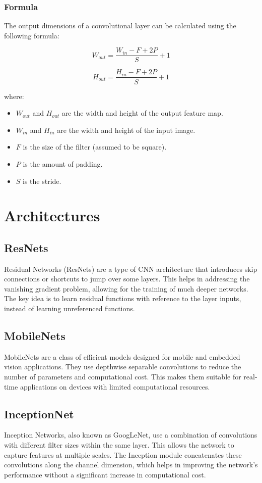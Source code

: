 \documentclass[12pt]{article}
\begin{document}
\subsubsection{Formula}
The output dimensions of a convolutional layer can be calculated using the following formula:

\[
W_{out} = \frac{W_{in} - F + 2P}{S} + 1
\]

\[
H_{out} = \frac{H_{in} - F + 2P}{S} + 1
\]

where:
\begin{itemize}
    \item \( W_{out} \) and \( H_{out} \) are the width and height of the output feature map.
    \item \( W_{in} \) and \( H_{in} \) are the width and height of the input image.
    \item \( F \) is the size of the filter (assumed to be square).
    \item \( P \) is the amount of padding.
    \item \( S \) is the stride.
\end{itemize}

\section{Architectures}

\subsection{ResNets}
Residual Networks (ResNets) are a type of CNN architecture that introduces skip connections or shortcuts to jump over some layers. This helps in addressing the vanishing gradient problem, allowing for the training of much deeper networks. The key idea is to learn residual functions with reference to the layer inputs, instead of learning unreferenced functions.

\subsection{MobileNets}
MobileNets are a class of efficient models designed for mobile and embedded vision applications. They use depthwise separable convolutions to reduce the number of parameters and computational cost. This makes them suitable for real-time applications on devices with limited computational resources.

\subsection{InceptionNet}
Inception Networks, also known as GoogLeNet, use a combination of convolutions with different filter sizes within the same layer. This allows the network to capture features at multiple scales. The Inception module concatenates these convolutions along the channel dimension, which helps in improving the network's performance without a significant increase in computational cost.
\end{document}
